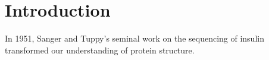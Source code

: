 \chapter{Introduction}

In 1951, Sanger and Tuppy's seminal work on the sequencing of insulin\cite{SangerT1951} transformed our understanding of protein structure.
